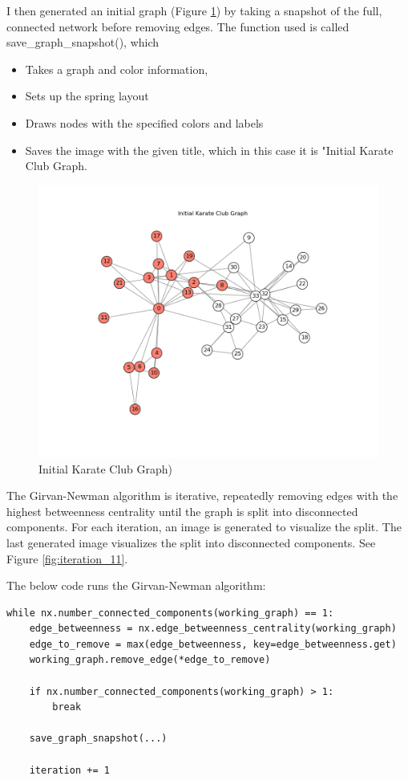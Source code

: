 \documentclass[12pt]{article}
\begin{document}
I then generated an initial graph (Figure \ref{fig:initial}) by taking a snapshot of the full, connected network before removing edges. The function used is called save\_graph\_snapshot(), which
\begin{itemize}
    \item Takes a graph and color information,
    \item Sets up the spring layout
    \item Draws nodes with the specified colors and labels
    \item Saves the image with the given title, which in this case it is "Initial Karate Club Graph.
\end{itemize}

\begin{figure}
    \centering
    \includegraphics[width=1\linewidth]{initial_karate_club_graph.png}
    \caption{Initial Karate Club Graph)}
    \label{fig:initial}
\end{figure}

The Girvan-Newman algorithm is iterative, repeatedly removing edges with the highest betweenness centrality until the graph is split into disconnected components. For each iteration, an image is generated to visualize the split. The last generated image visualizes the split into disconnected components. See Figure \ref{fig:iteration_11}.

The below code runs the Girvan-Newman algorithm:
\begin{lstlisting}
while nx.number_connected_components(working_graph) == 1:
    edge_betweenness = nx.edge_betweenness_centrality(working_graph)
    edge_to_remove = max(edge_betweenness, key=edge_betweenness.get)
    working_graph.remove_edge(*edge_to_remove)

    if nx.number_connected_components(working_graph) > 1:
        break

    save_graph_snapshot(...)

    iteration += 1    
\end{lstlisting}
\end{document}
